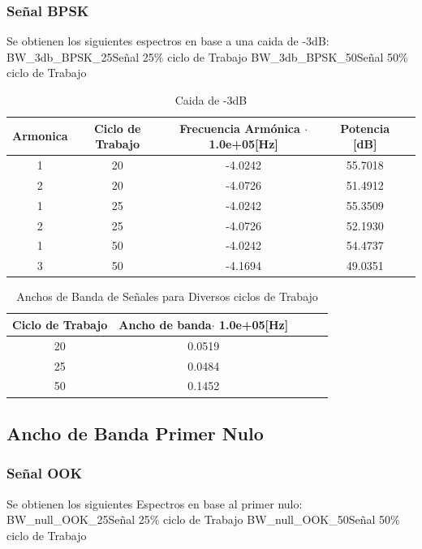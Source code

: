 \documentclass[letterpaper, titlepage]{article}
\begin{document}
\begin{enumerate}
			\subsubsection{Señal BPSK}
		Se obtienen los siguientes espectros en base a una caida de -3dB:\\
			 {BW_3db_BPSK_25}{\label{fig:sim}}{Señal 25\% ciclo de Trabajo}
			 {BW_3db_BPSK_50}{\label{fig:sim}}{Señal 50\% ciclo de Trabajo}\\	
			 		
			\begin{table}[ht]
			\centering
			\begin{tabular}{c c c c c}
				Armonica & Ciclo de Trabajo & Frecuencia Armónica $\cdot$ 1.0e+05[Hz] & Potencia [dB]\\
				\hline
				1 & 20 & -4.0242 & 55.7018  \\
				2 & 20 & -4.0726 & 51.4912	\\
				1 & 25 & -4.0242 & 55.3509   \\
				2 & 25 & -4.0726 & 52.1930   \\
				1 & 50 & -4.0242 & 54.4737  \\
				3 & 50 & -4.1694 & 49.0351   \\
			\end{tabular}
			\caption{Caida de -3dB}
			\label{tab:tabla1}
		\end{table}				

		\begin{table}[ht]
			\centering
			\begin{tabular}{c c c c c}
				Ciclo de Trabajo & Ancho de banda$\cdot$ 1.0e+05[Hz] \\
				\hline
				20 & 0.0519  \\
				25 & 0.0484	  \\
				50 & 0.1452   \\
			\end{tabular}
			\caption{Anchos de Banda de Señales para Diversos ciclos de Trabajo}
			\label{tab:tabla1}
		\end{table}			
			
			
		\subsection{Ancho de Banda Primer Nulo}
			\subsubsection{Señal OOK}
			Se obtienen los siguientes Espectros en base al primer nulo:\\
			 {BW_null_OOK_25}{\label{fig:sim}}{Señal 25\% ciclo de Trabajo}
			 {BW_null_OOK_50}{\label{fig:sim}}{Señal 50\% ciclo de Trabajo}\\
			 

\end{enumerate}
\end{document}
